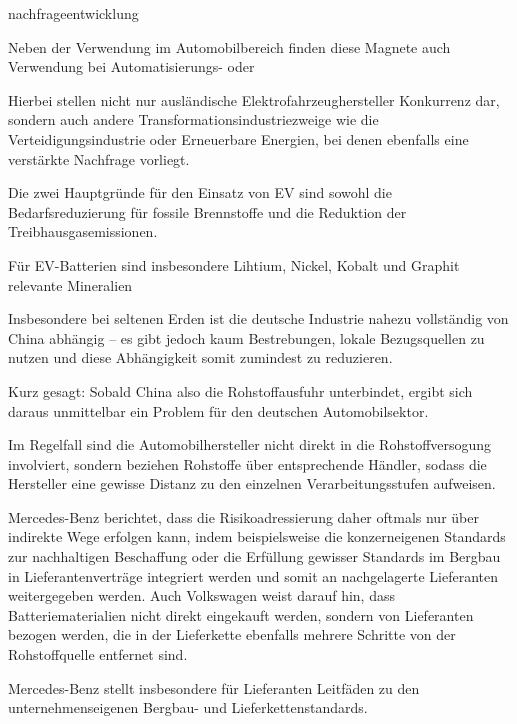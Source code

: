\documentclass[12pt,a4paper,oneside]{book} %
\begin{document}
{	nachfrageentwicklung
	

	
	Neben der Verwendung im Automobilbereich finden diese Magnete auch Verwendung bei Automatisierungs- oder 
	
	Hierbei stellen nicht nur ausländische Elektrofahrzeughersteller Konkurrenz dar, sondern auch andere Transformationsindustriezweige wie die Verteidigungsindustrie oder Erneuerbare Energien, bei denen ebenfalls eine verstärkte Nachfrage vorliegt.\autocite{Expertenkreis Automobilwirtschaft}
	
	Die zwei Hauptgründe für den Einsatz von EV sind sowohl die Bedarfsreduzierung für fossile Brennstoffe und die Reduktion der Treibhausgasemissionen.\autocite{A comprehensive overview of electric vehicle batteries market, Fazel Mohammadi}
	
	Für EV-Batterien sind insbesondere Lihtium, Nickel, Kobalt und Graphit relevante Mineralien
	
	Insbesondere bei seltenen Erden ist die deutsche Industrie nahezu vollständig von China abhängig -- es gibt jedoch kaum Bestrebungen, lokale Bezugsquellen zu nutzen und diese Abhängigkeit somit zumindest zu reduzieren.
	
	Kurz gesagt: Sobald China also die Rohstoffausfuhr unterbindet, ergibt sich daraus unmittelbar ein Problem für den deutschen Automobilsektor.
	
	Im Regelfall sind die Automobilhersteller nicht direkt in die Rohstoffversogung involviert, sondern beziehen Rohstoffe über entsprechende Händler, sodass die Hersteller eine gewisse Distanz zu den einzelnen Verarbeitungsstufen aufweisen.
	
	Mercedes-Benz berichtet, dass die Risikoadressierung daher oftmals nur über indirekte Wege erfolgen kann, indem beispielsweise die konzerneigenen Standards zur nachhaltigen Beschaffung oder die Erfüllung gewisser Standards im Bergbau in Lieferantenverträge integriert werden und somit an nachgelagerte Lieferanten weitergegeben werden.\autocite{Standpunkt Mercedes-Benz: Effektive Standards, https://www.lobbyregister.bundestag.de/media/f2/d7/320631/Stellungnahme-Gutachten-SG2406190121.pdf} Auch Volkswagen weist darauf hin, dass Batteriematerialien nicht direkt eingekauft werden, sondern von Lieferanten bezogen werden, die in der Lieferkette ebenfalls mehrere Schritte von der Rohstoffquelle entfernet sind.\autocite{Volkswagen Group Responsible Raw Materials Report 2024, S. 24}
	
	Mercedes-Benz stellt insbesondere für Lieferanten Leitfäden zu den unternehmenseigenen Bergbau- und Lieferkettenstandards.\autocite{https://supplier.mercedes-benz.com/docs/DOC-3222}
	
}
\end{document}

